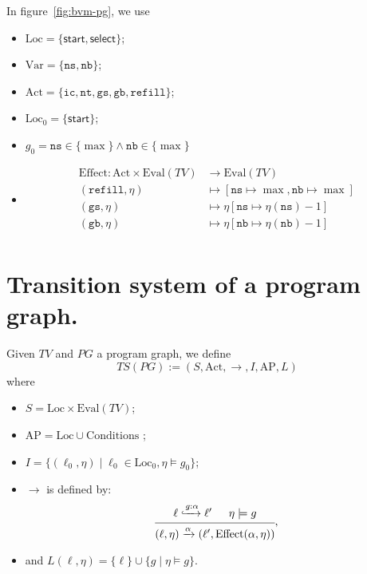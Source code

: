 \documentclass[./main]{subfiles}
\begin{document}
  \begin{exm}
    In figure~\ref{fig:bvm-pg}, we use 
    \begin{itemize}
      \item $\mathrm{Loc} = \{\mathsf{start},\mathsf{select}\}$;
      \item $\mathrm{Var} = \{\mathtt{ns}, \mathtt{nb}\}$;
      \item $\mathrm{Act} = \{\mathtt{ic}, \mathtt{nt}, \mathtt{gs}, \mathtt{gb}, \mathtt{refill}\}$;
      \item $\mathrm{Loc}_0 = \{\mathsf{start}\}$;
      \item $g_0 = \mathtt{ns} \in  \{\max\} \land \mathtt{nb} \in \{\max\}$ 
      \item 
        \begin{align*}
          \mathrm{Effect}: \mathrm{Act} \times \mathrm{Eval}(TV) &\longrightarrow \mathrm{Eval}(TV) \\
          (\mathtt{refill}, \eta) &\longmapsto[\mathtt{ns} \mapsto {\max}, \mathtt{nb} \mapsto {\max}]\\
          (\mathtt{gs}, \eta) &\longmapsto \eta[\mathtt{ns} \mapsto \eta(\mathtt{ns}) - 1]\\
          (\mathtt{gb}, \eta) &\longmapsto \eta[\mathtt{nb} \mapsto \eta(\mathtt{nb}) - 1]\\
        \end{align*}
    \end{itemize}
  \end{exm}

  \section{Transition system of a program graph.}

  \begin{defn}
    Given $TV$ and $PG$ a program graph, we define 
    \[
      TS(PG) := (S, \mathrm{Act}, {\to}, I, \mathrm{AP}, L)
    \]
    where
    \begin{itemize}
      \item $S = \mathrm{Loc} \times \mathrm{Eval}(TV)$;
      \item $\mathrm{AP} = \mathrm{Loc} \cup \mathrm{Conditions}$ ;
      \item $I = \{(\ell_0, \eta)  \mid \ell_0 \in \mathrm{Loc}_0, \eta \models g_0\}$;
      \item $\to$ is defined by:
        \[
        \begin{prooftree}
          \hypo{\ell \trh{g : \alpha} \ell'}
          \hypo{\eta \models g}
          \infer 2{(\ell, \eta) \tr \alpha (\ell', \mathrm{Effect}(\alpha, \eta))}
        \end{prooftree}
        ,\] 
      \item and $L(\ell, \eta) = \{\ell\} \cup \{g  \mid \eta \models g\}$.
    \end{itemize}
  \end{defn}
\end{document}
